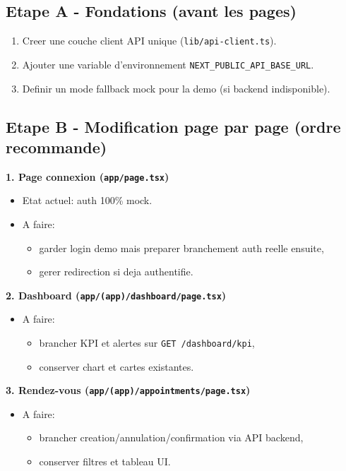 \documentclass[11pt,a4paper]{article}
\begin{document}
\subsection*{Etape A - Fondations (avant les pages)}
\begin{enumerate}[leftmargin=*]
  \item Creer une couche client API unique (\texttt{lib/api-client.ts}).
  \item Ajouter une variable d'environnement \texttt{NEXT\_PUBLIC\_API\_BASE\_URL}.
  \item Definir un mode fallback mock pour la demo (si backend indisponible).
\end{enumerate}

\subsection*{Etape B - Modification page par page (ordre recommande)}

\textbf{1. Page connexion (\texttt{app/page.tsx})}
\begin{itemize}[leftmargin=*]
  \item Etat actuel: auth 100\% mock.
  \item A faire:
  \begin{itemize}
    \item garder login demo mais preparer branchement auth reelle ensuite,
    \item gerer redirection si deja authentifie.
  \end{itemize}
\end{itemize}

\textbf{2. Dashboard (\texttt{app/(app)/dashboard/page.tsx})}
\begin{itemize}[leftmargin=*]
  \item A faire:
  \begin{itemize}
    \item brancher KPI et alertes sur \texttt{GET /dashboard/kpi},
    \item conserver chart et cartes existantes.
  \end{itemize}
\end{itemize}

\textbf{3. Rendez-vous (\texttt{app/(app)/appointments/page.tsx})}
\begin{itemize}[leftmargin=*]
  \item A faire:
  \begin{itemize}
    \item brancher creation/annulation/confirmation via API backend,
    \item conserver filtres et tableau UI.
  \end{itemize}
\end{itemize}
\end{document}
